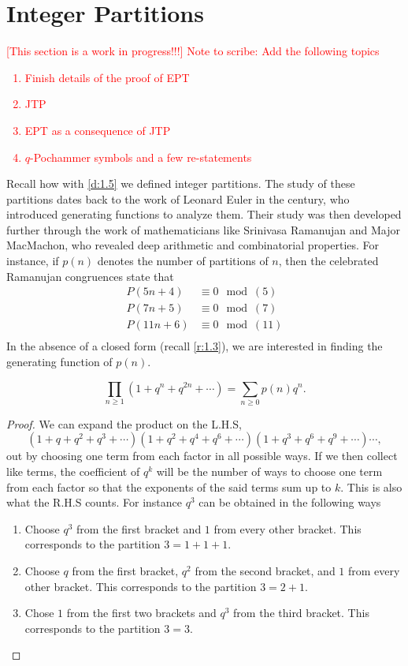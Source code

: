 \section{Integer Partitions}
\textcolor{red}{
[This section is a work in progress!!!] Note to scribe: Add the following topics
\begin{enumerate}
    \item Finish details of the proof of EPT
    \item JTP
    \item EPT as a consequence of JTP
    \item $q$-Pochammer symbols and a few re-statements
\end{enumerate}
}
Recall how with \cref{d:1.5} we defined integer partitions. The study of these partitions dates back to the work of Leonard Euler in the  century, who introduced generating functions to analyze them. Their study was then developed further through the work of mathematicians like Srinivasa Ramanujan and Major MacMachon, who revealed deep arithmetic and combinatorial properties. For instance, if $p(n)$ denotes the number of partitions of $n$, then the celebrated Ramanujan congruences state that
\begin{align*}
P(5n+4)&\equiv 0\mod{(5)} \\
P(7n+5)&\equiv 0\mod{(7)} \\
P(11n+6)&\equiv 0\mod{(11)} \\ 
\end{align*}
In the absence of a closed form (recall \cref{r:1.3}), we are interested in finding the generating function of $p(n)$.
\begin{claim}\[
\prod_{n\geq 1}(1+q^n+q^{2n}+\cdots) = \sum_{n\geq 0}p(n)q^n.
\]
\label{c:2.1P}
\end{claim}
\begin{proof}
We can expand the product on the L.H.S, \[(1+q+q^2+q^3+\cdots)(1+q^2+q^4+q^6+\cdots)(1+q^3+q^6+q^9+\cdots)\cdots,\] out by choosing one term from each factor in all possible ways. If we then collect like terms, the coefficient of $q^k$ will be the number of ways to choose one term from each factor so that the exponents of the said terms sum up to $k$. This is also what the R.H.S counts. For instance $q^3$ can be obtained in the following ways
\begin{enumerate}
    \item Choose $q^3$ from the first bracket and $1$ from every other bracket. This corresponds to the partition $3=1+1+1$.
    \item Choose $q$ from the first bracket, $q^2$ from the second bracket, and $1$ from every other bracket. This corresponds to the partition $3=2+1$. 
    \item Chose $1$ from the first two brackets and $q^3$ from the third bracket. This corresponds to the partition $3=3$. 
\end{enumerate}
\end{proof}

